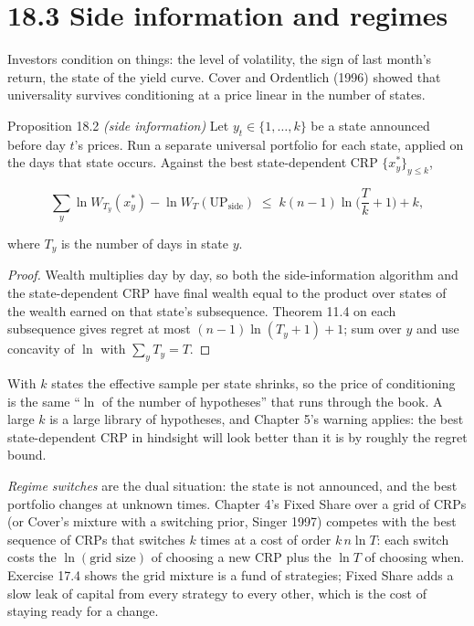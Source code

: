 \documentclass[11pt,a4paper,openany]{book}
\begin{document}
\section*{18.3 Side information and regimes}\label{ch18-side}

Investors condition on things: the level of volatility, the sign of last month's return, the state of the yield curve. Cover and Ordentlich (1996) showed that universality survives conditioning at a price linear in the number of states.

\begin{bthm}{Proposition 18.2 \emph{(side information)}}
Let $y_t\in\{1,\dots,k\}$ be a state announced before day $t$'s prices. Run a separate universal portfolio for each state, applied on the days that state occurs. Against the best state-dependent CRP $\{x^*_y\}_{y\le k}$,

\[\sum_y\ln W_{T_y}(x^*_y)-\ln W_T(\mathrm{UP}_{\text{side}})\;\le\;k(n-1)\ln\Big(\frac Tk+1\Big)+k,\]

where $T_y$ is the number of days in state $y$.
\end{bthm}

\begin{proof}
Wealth multiplies day by day, so both the side-information algorithm and the state-dependent CRP have final wealth equal to the product over states of the wealth earned on that state's subsequence. Theorem 11.4 on each subsequence gives regret at most $(n-1)\ln(T_y+1)+1$; sum over $y$ and use concavity of $\ln$ with $\sum_yT_y=T$.
\end{proof}

With $k$ states the effective sample per state shrinks, so the price of conditioning is the same ``$\ln$ of the number of hypotheses'' that runs through the book. A large $k$ is a large library of hypotheses, and Chapter 5's warning applies: the best state-dependent CRP in hindsight will look better than it is by roughly the regret bound.

\emph{Regime switches} are the dual situation: the state is not announced, and the best portfolio changes at unknown times. Chapter 4's Fixed Share over a grid of CRPs (or Cover's mixture with a switching prior, Singer 1997) competes with the best sequence of CRPs that switches $k$ times at a cost of order $k\,n\ln T$: each switch costs the $\ln(\text{grid size})$ of choosing a new CRP plus the $\ln T$ of choosing when. Exercise 17.4 shows the grid mixture is a fund of strategies; Fixed Share adds a slow leak of capital from every strategy to every other, which is the cost of staying ready for a change.
\end{document}

